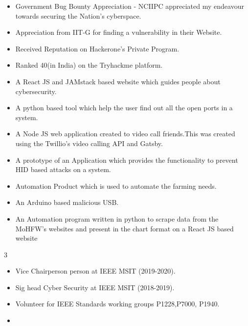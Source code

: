 
\begin{itemize}
\item Government Bug Bounty Appreciation - NCIIPC appreciated my endeavour towards securing the Nation's cyberspace.
\item Appreciation from IIT-G for finding a vulnerability in their Website.
\item Received Reputation on Hackerone's Private Program.
\item Ranked 40(in India) on the Tryhackme platform.
\end{itemize}

\begin{itemize}
\item A React JS and JAMstack based website which guides people about cybersecurity. 
\end{itemize}

\begin{itemize}
\item A python based tool which help the user find out all the open ports in a system.
\end{itemize}

\begin{itemize}
\item A Node JS web application created to video call friends.This was created using the Twillio's video calling  API and Gatsby.  
\end{itemize}

\begin{itemize}
\item A prototype of an Application which provides the functionality to prevent HID based attacks on a system.
\end{itemize}

\begin{itemize}
\item Automation Product which is used to automate the farming needs.
\end{itemize}

\begin{itemize}
\item An Arduino based malicious USB.  
\end{itemize}

\begin{itemize}
\item An Automation program written in python to scrape data from the MoHFW's websites and present in the chart format on a React JS based website
\end{itemize}
 {3}

\begin{itemize}
\item Vice Chairperson person at IEEE MSIT (2019-2020).
\item Sig head Cyber Security at IEEE MSIT (2018-2019).
\item Volunteer for IEEE Standards working groups  P1228,P7000, P1940.
\item \end{itemize}

